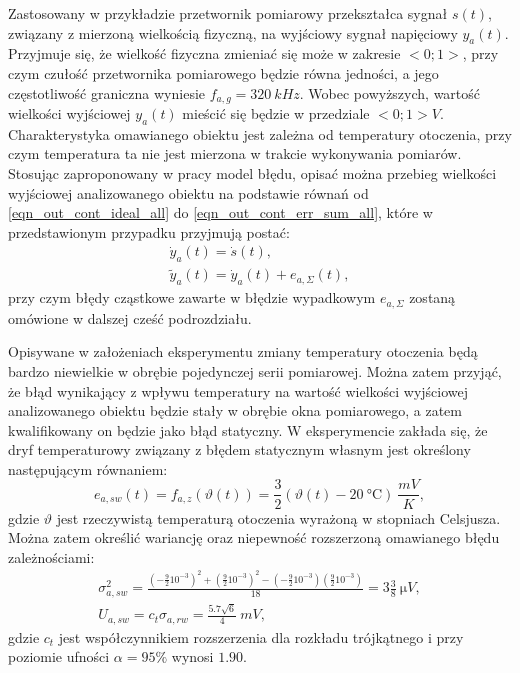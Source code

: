 Zastosowany w przykładzie przetwornik pomiarowy przekształca sygnał $s(t)$, związany z mierzoną wielkością fizyczną, na wyjściowy sygnał napięciowy $y_{a}(t)$. Przyjmuje się, że wielkość fizyczna zmieniać się może w zakresie $<0;1>$, przy czym czułość przetwornika pomiarowego będzie równa jedności, a jego częstotliwość graniczna wyniesie $f_{a,g} = \qty{320}{kHz}$. Wobec powyższych, wartość wielkości wyjściowej $y_{a}(t)$ mieścić się będzie w przedziale $<0;1>\unit{V}$. Charakterystyka omawianego obiektu jest zależna od temperatury otoczenia, przy czym temperatura ta nie jest mierzona w trakcie wykonywania pomiarów. Stosując zaproponowany w pracy model błędu, opisać można przebieg wielkości wyjściowej analizowanego obiektu na podstawie równań od \eqref{eqn_out_cont_ideal_all} do \eqref{eqn_out_cont_err_sum_all}, które w przedstawionym przypadku przyjmują postać:
\begin{gather}
\dot{y}_{a} \left( t \right) = \dot{s} \left( t \right) \label{eqn_sym_parta_out_ideal}, \\
\tilde{y}_{a} \left( t \right) = \dot{y}_{a} \left( t \right) + e_{a,\Sigma} \left( t \right) \label{eqn_sym_parta_out_real},
\end{gather}
przy czym błędy cząstkowe zawarte w błędzie wypadkowym $e_{a,\Sigma}$ zostaną omówione w dalszej cześć podrozdziału.

Opisywane w założeniach eksperymentu zmiany temperatury otoczenia będą bardzo niewielkie w obrębie pojedynczej serii pomiarowej. Można zatem przyjąć, że błąd wynikający z wpływu temperatury na wartość wielkości wyjściowej analizowanego obiektu będzie stały w obrębie okna pomiarowego, a zatem kwalifikowany on będzie jako błąd statyczny. W eksperymencie zakłada się, że dryf temperaturowy związany z błędem statycznym własnym jest określony następującym równaniem:
\begin{equation}
e_{a,sw} \left( t \right) = f_{a,z} \left( \vartheta \left( t \right) \right) = \frac{3}{2} \left( \vartheta \left( t \right) - \qty{20}{\degreeCelsius} \right) ~\unit{\frac{mV}{K}} \label{eqn_sym_parta_stat_err},
\end{equation}
gdzie $\vartheta$ jest rzeczywistą temperaturą otoczenia wyrażoną w stopniach Celsjusza. Można zatem określić wariancję oraz niepewność rozszerzoną omawianego błędu zależnościami:
\begin{gather}
\sigma_{a,sw}^{2} = \frac{\left( -\frac{9}{2} 10^{-3} \right)^{2} + \left( \frac{9}{2} 10^{-3} \right)^{2} - \left( -\frac{9}{2} 10^{-3} \right) \left( \frac{9}{2} 10^{-3} \right)}{18} = 3 \frac{3}{8} ~\unit{\micro V} \label{eqn_sym_parta_stat_var}, \\
U_{a,sw} = c_{t} \sigma_{a,rw} = \frac{5.7 \sqrt{6}}{4} ~\unit{mV} \label{eqn_sym_parta_stat_unc},
\end{gather}
gdzie $c_{t}$ jest współczynnikiem rozszerzenia dla rozkładu trójkątnego i przy poziomie ufności $\alpha = 95\%$ wynosi $1.90$.

